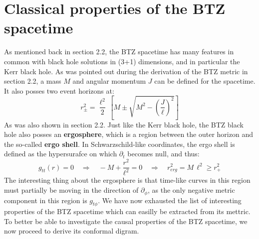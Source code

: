 %
\section{Classical properties of the BTZ spacetime}
As mentioned back in section 2.2, the BTZ spacetime has many features in common with black hole solutions in (3+1) dimensions, and in particular the Kerr black hole. As was pointed out during the derivation of the BTZ metric in section 2.2, a mass $M$ and angular momentum $J$ can be defined for the spacetime. It also posses two event horizons at:
%
%
\begin{equation}
r^2_{\pm}
=  \frac{\ell^2}{2} \, \left[
M \pm \sqrt{M^2 - \left(\frac{J}{\ell} \right)^2}
\right]
\end{equation}
As was also shown in section 2.2. Just like the Kerr black hole, the BTZ black hole also posses an \textbf{ergosphere}, which is a region between the outer horizon and the so-called \textbf{ergo shell}. In Schwarzschild-like coordinates, the ergo shell is defined as the hypersurafce on which $\partial_t$ becomes null, and thus:
%
%
\begin{equation}
g_{tt}(r) = 0
\quad \Rightarrow \quad
-M + \frac{r^2}{\ell^2} = 0
\quad \Rightarrow \quad
r_{erg}^2 = M \, \ell^2 \geq r_+^2
\end{equation}
%
%
The interesting thing about the ergosphere is that time-like curves in this region must partially be moving in the direction of $\partial_{\phi}$, as the only negative metric component in this region is $g_{t\phi}$.\newline
We have now exhausted the list of interesting properties of the BTZ spacetime which can easilly be extracted from its mettric. To better be able to investigate the causal properties of the BTZ spacetime, we now proceed to derive its conformal digram.

